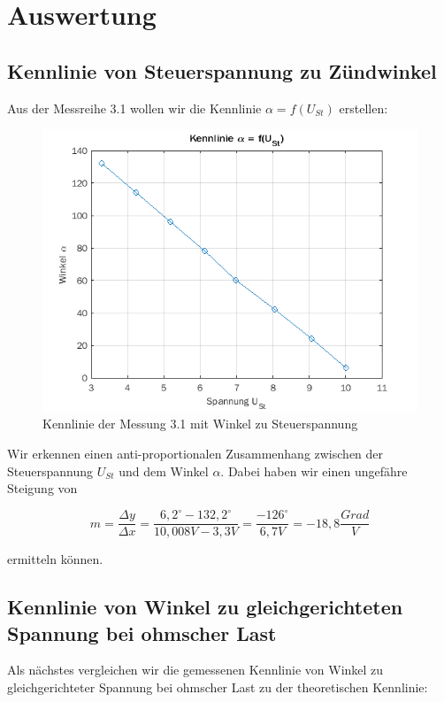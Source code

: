 \documentclass{article}
\begin{document}
\section{Auswertung}

\subsection{Kennlinie von Steuerspannung zu Zündwinkel}
\label{sec:kennl-von-steu}

Aus der Messreihe 3.1 wollen wir die Kennlinie $\alpha = f(U_{St})$ erstellen:

\begin{figure}[h]
  \centering
  \includegraphics[width=.75\textwidth]{../assets/images/GEP2/alpha_ust.png}
  \caption{Kennlinie der Messung 3.1 mit Winkel zu Steuerspannung}
  \label{fig:alphaust}
\end{figure}

Wir erkennen einen anti-proportionalen Zusammenhang zwischen der Steuerspannung $U_{St}$ und dem Winkel $\alpha$. Dabei haben wir einen ungefähre Steigung von

\begin{equation*}
  m = \frac{\Delta y}{\Delta x} = \frac{6,2^{\circ} - 132,2^{\circ}}{10,008V - 3,3V} = \frac{-126^{\circ}}{6,7V} = -18,8 \frac{Grad}{V}
\end{equation*}

ermitteln können.

\subsection{Kennlinie von Winkel zu gleichgerichteten Spannung bei ohmscher Last}
\label{sec:kennlinie-von-winkel}

Als nächstes vergleichen wir die gemessenen Kennlinie von Winkel zu gleichgerichteter Spannung bei ohmscher Last zu der theoretischen Kennlinie:
\end{document}

